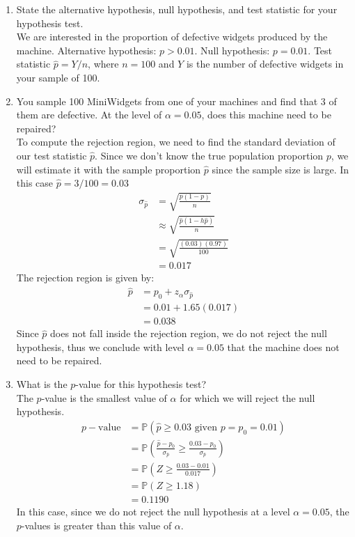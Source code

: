 \documentclass[12pt]{article}
\def\P{{\mathbb P}}
\begin{document}
\begin{enumerate}
\begin{enumerate}
\item State the alternative hypothesis, null hypothesis, and test statistic for your hypothesis test. \\

We are interested in the proportion of defective widgets produced by the machine. Alternative hypothesis: $p > 0.01$. Null hypothesis: $p = 0.01$. Test statistic $\hat{p} = Y / n$, where $n = 100$ and $Y$ is the number of defective widgets in your sample of 100.

\item You sample 100 MiniWidgets from one of your machines and find that 3 of them are defective. At the level of $\alpha = 0.05$, does this machine need to be repaired?\\

To compute the rejection region, we need to find the standard deviation of our test statistic $\hat{p}$. Since we don't know the true population proportion $p$, we will estimate it with the sample proportion $\hat{p}$ since the sample size is large. In this case $\hat{p} = 3/100 = 0.03$
\begin{align*}
\sigma_{\hat{p}} &= \sqrt{\frac{p(1-p)}{n} }\\
&\approx \sqrt{\frac{\hat{p}(1-h\hat{p})}{n} }\\
&= \sqrt{ \frac{ (0.03)(0.97) }{100 } } \\
&= 0.017
\end{align*}
The rejection region is given by:
\begin{align*}
\hat{p} &= p_0 + z_\alpha \sigma_{\hat{p}} \\
&= 0.01 + 1.65 ( 0.017 ) \\
&= 0.038
\end{align*}
Since $\hat{p}$ does not fall inside the rejection region, we do not reject the null hypothesis, thus we conclude with level $\alpha = 0.05$ that the machine does not need to be repaired.

\item What is the $p$-value for this hypothesis test?\\

The $p$-value is the smallest value of $\alpha$ for which we will reject the null hypothesis.
\begin{align*}
p-\text{value} &= \P(\hat{p} \geq 0.03 \text{ given } p = p_0 = 0.01)\\
&= \P \left( \frac{\hat{p} - p_0}{ \sigma_{\hat{p}} } \geq  \frac{0.03 - p_0}{ \sigma_{\hat{p}} } \right) \\
&= \P \left( Z \geq  \frac{0.03 - 0.01}{ 0.017 } \right) \\
&= \P ( Z \geq 1.18) \\
&= 0.1190
\end{align*}
In this case, since we do not reject the null hypothesis at a level $\alpha = 0.05$, the $p$-values is greater than this value of $\alpha$.
\end{enumerate}


\end{enumerate}
\end{document}
